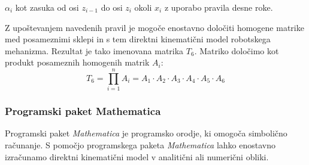 \begin{mdframed}[backgroundcolor=green!20, shadow=false,roundcorner=12pt,topline
=false, rightline=false,bottomline=false,leftline=false]
\begin{description}
\item \vspace*{-0.1cm} $\alpha_i$ kot zasuka od osi $z_{i-1}$ do osi
$z_{i}$ okoli $x_{i}$ z uporabo pravila desne roke.
\end{description}

Z upoštevanjem navedenih pravil je mogoče enostavno določiti homogene matrike
med posameznimi sklepi in s tem direktni kinematični model robotskega
mehanizma. Rezultat je tako imenovana matrika $T_6$. Matriko določimo kot
produkt posameznih homogenih matrik $A_i$:
\begin{equation}
T_6 = \prod_{i=1}^n A_i = A_1 \cdot A_2 \cdot A_3 \cdot A_4 \cdot A_5
\cdot A_6
\end{equation}

\end{mdframed}

\subsubsection{Programski paket Mathematica}

Programski paket \emph{Mathematica} je programsko orodje, ki omogoča
simbolično računanje. S pomočjo programskega paketa \emph{Mathematica} lahko
enostavno izračunamo direktni kinematični model v analitični ali numerični
obliki.

\vspace{5mm}


